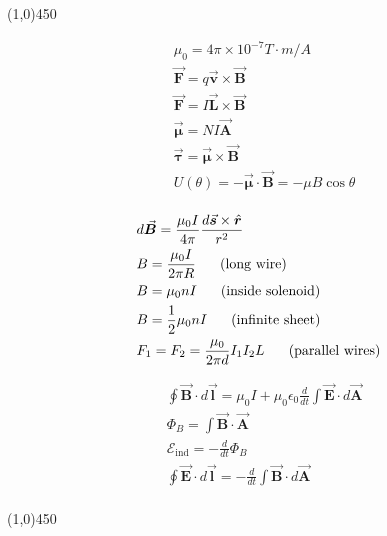 \documentclass[9pt,letterpaper]{article}
\newcommand{\vect}[1]{\vec{\boldsymbol{#1}}}
\newcommand{\vhat}[1]{\hat{\boldsymbol{#1}}}
\begin{document}
\vspace{-0.25in}
\begin{center}
\line(1,0){450}
\end{center}


\vspace{-0.35in}
\begin{minipage}[t]{0.30\linewidth}
\begin{align*}
    &\mu_{0} = 4\pi \times 10^{-7} T\cdot m/A\\
    &\vect{F}=q\vect{v}\times \vect{B}\\
    &\vect{F}=I\vect{L}\times \vect{B}\\
    &\vect{\mu} = NI\vect{A}\\
    &\vect{\tau}=\vect{\mu}\times \vect{B}\\
    &U(\theta)=-\vect{\mu}\cdot\vect{B}=-\mu B\cos{\theta}\\
\end{align*}
\end{minipage}
\begin{minipage}[t]{0.33\linewidth}
\begin{align*}
    &d\vect{B} = \frac{\mu_{0}I}{4\pi} \frac{d\vect{s}\times \vhat{r}}{r^{2}}\\
    &B = \frac{\mu_{0}I}{2\pi R} \hspace{0.05\linewidth}\text{(long wire)} \\
    &B = \mu_{0}nI\hspace{0.05\linewidth}\text{(inside solenoid)}\\
    &B = \frac{1}{2}\mu_{0}nI\hspace{0.05\linewidth}\text{(infinite sheet)}\\
    &F_{1} = F_{2} = \frac{\mu_{0}}{2\pi d} I_{1}I_{2}L \hspace{0.05\linewidth}\text{(parallel wires)}\\
\end{align*}
\end{minipage}
\hspace{-0.2in}
\begin{minipage}[t]{0.33\linewidth}
\begin{align*}
    &\oint \vect{B}\cdot d\vect{l} = \mu_{0} I + \mu_{0} \epsilon_{0} \frac{d}{dt} \int \vect{E}\cdot d\vect{A}\\
    &\Phi_{B} = \int \vect{B}\cdot \vect{A}\\
    &\mathcal{E}_{\text{ind}} = -\frac{d}{dt}\Phi_{B}\\
    &\oint \vect{E}\cdot d\vect{l} = -\frac{d}{dt} \int \vect{B}\cdot d\vect{A}\\
\end{align*}
\end{minipage}
\vspace{-0.3in}
\begin{center}
\line(1,0){450}
\end{center}
\end{document}
